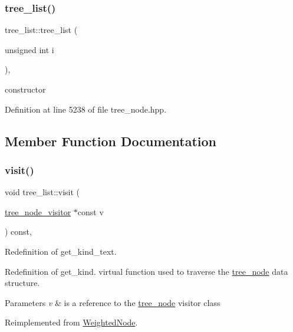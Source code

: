 \subsubsection{\texorpdfstring{tree\+\_\+list()}{tree\_list()}}
{\footnotesize\ttfamily tree\+\_\+list\+::tree\+\_\+list (\begin{DoxyParamCaption}\item[{unsigned int}]{i }\end{DoxyParamCaption})\hspace{0.3cm}{\ttfamily [inline]}, {\ttfamily [explicit]}}



constructor 



Definition at line 5238 of file tree\+\_\+node.\+hpp.



\subsection{Member Function Documentation}
\mbox{\label{structtree__list_aba63a94a601053b16420e7f757237b5d}} 
\subsubsection{\texorpdfstring{visit()}{visit()}}
{\footnotesize\ttfamily void tree\+\_\+list\+::visit (\begin{DoxyParamCaption}\item[{\hyperlink{classtree__node__visitor}{tree\+\_\+node\+\_\+visitor} $\ast$const}]{v }\end{DoxyParamCaption}) const\hspace{0.3cm}{\ttfamily [override]}, {\ttfamily [virtual]}}



Redefinition of get\+\_\+kind\+\_\+text. 

Redefinition of get\+\_\+kind. virtual function used to traverse the \hyperlink{classtree__node}{tree\+\_\+node} data structure. 
\begin{DoxyParams}{Parameters}
{\em v} & is a reference to the \hyperlink{classtree__node}{tree\+\_\+node} visitor class \\
\hline
\end{DoxyParams}


Reimplemented from \hyperlink{structWeightedNode_a6f976feccb640a60f96475a668314fde}{Weighted\+Node}.



